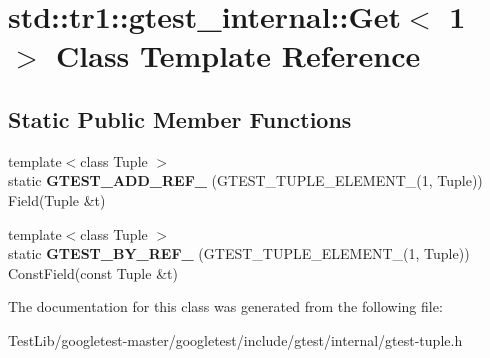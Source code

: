 \hypertarget{classstd_1_1tr1_1_1gtest__internal_1_1Get_3_011_01_4}{}\section{std\+:\+:tr1\+:\+:gtest\+\_\+internal\+:\+:Get$<$ 1 $>$ Class Template Reference}
\label{classstd_1_1tr1_1_1gtest__internal_1_1Get_3_011_01_4}
\subsection*{Static Public Member Functions}
\begin{DoxyCompactItemize}
\item 
\mbox{\label{classstd_1_1tr1_1_1gtest__internal_1_1Get_3_011_01_4_a52b2f5d2bc283d76a3e8dede84dba154}} 
{\footnotesize template$<$class Tuple $>$ }\\static {\bfseries G\+T\+E\+S\+T\+\_\+\+A\+D\+D\+\_\+\+R\+E\+F\+\_\+} (G\+T\+E\+S\+T\+\_\+\+T\+U\+P\+L\+E\+\_\+\+E\+L\+E\+M\+E\+N\+T\+\_\+(1, Tuple)) Field(Tuple \&t)
\item 
\mbox{\label{classstd_1_1tr1_1_1gtest__internal_1_1Get_3_011_01_4_a481a2bf839c758408d46a1d0d41ff8f4}} 
{\footnotesize template$<$class Tuple $>$ }\\static {\bfseries G\+T\+E\+S\+T\+\_\+\+B\+Y\+\_\+\+R\+E\+F\+\_\+} (G\+T\+E\+S\+T\+\_\+\+T\+U\+P\+L\+E\+\_\+\+E\+L\+E\+M\+E\+N\+T\+\_\+(1, Tuple)) Const\+Field(const Tuple \&t)
\end{DoxyCompactItemize}


The documentation for this class was generated from the following file\+:\begin{DoxyCompactItemize}
\item 
Test\+Lib/googletest-\/master/googletest/include/gtest/internal/gtest-\/tuple.\+h\end{DoxyCompactItemize}
